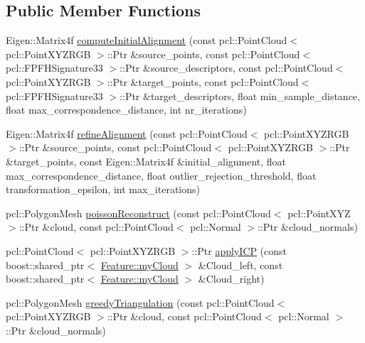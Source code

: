 \subsection*{Public Member Functions}
\begin{DoxyCompactItemize}
\item 
Eigen\+::\+Matrix4f \hyperlink{class_registration_af6438bb515d5f1f24111f8b97384b280}{compute\+Initial\+Alignment} (const pcl\+::\+Point\+Cloud$<$ pcl\+::\+Point\+X\+Y\+Z\+R\+GB $>$\+::Ptr \&source\+\_\+points, const pcl\+::\+Point\+Cloud$<$ pcl\+::\+F\+P\+F\+H\+Signature33 $>$\+::Ptr \&source\+\_\+descriptors, const pcl\+::\+Point\+Cloud$<$ pcl\+::\+Point\+X\+Y\+Z\+R\+GB $>$\+::Ptr \&target\+\_\+points, const pcl\+::\+Point\+Cloud$<$ pcl\+::\+F\+P\+F\+H\+Signature33 $>$\+::Ptr \&target\+\_\+descriptors, float min\+\_\+sample\+\_\+distance, float max\+\_\+correspondence\+\_\+distance, int nr\+\_\+iterations)
\item 
Eigen\+::\+Matrix4f \hyperlink{class_registration_add23c5ac003e016a3d7b66a7545615c5}{refine\+Alignment} (const pcl\+::\+Point\+Cloud$<$ pcl\+::\+Point\+X\+Y\+Z\+R\+GB $>$\+::Ptr \&source\+\_\+points, const pcl\+::\+Point\+Cloud$<$ pcl\+::\+Point\+X\+Y\+Z\+R\+GB $>$\+::Ptr \&target\+\_\+points, const Eigen\+::\+Matrix4f \&initial\+\_\+alignment, float max\+\_\+correspondence\+\_\+distance, float outlier\+\_\+rejection\+\_\+threshold, float transformation\+\_\+epsilon, int max\+\_\+iterations)
\item 
pcl\+::\+Polygon\+Mesh \hyperlink{class_registration_aa426fa2e667b8deebae10feaaca2c9ab}{poisson\+Reconstruct} (const pcl\+::\+Point\+Cloud$<$ pcl\+::\+Point\+X\+YZ $>$\+::Ptr \&cloud, const pcl\+::\+Point\+Cloud$<$ pcl\+::\+Normal $>$\+::Ptr \&cloud\+\_\+normals)
\item 
pcl\+::\+Point\+Cloud$<$ pcl\+::\+Point\+X\+Y\+Z\+R\+GB $>$\+::Ptr \hyperlink{class_registration_a3283eaf6aa94fbb2d7e697cd8ce6baef}{apply\+I\+CP} (const boost\+::shared\+\_\+ptr$<$ \hyperlink{struct_feature_1_1my_cloud}{Feature\+::my\+Cloud} $>$ \&Cloud\+\_\+left, const boost\+::shared\+\_\+ptr$<$ \hyperlink{struct_feature_1_1my_cloud}{Feature\+::my\+Cloud} $>$ \&Cloud\+\_\+right)
\item 
pcl\+::\+Polygon\+Mesh \hyperlink{class_registration_a14ea447775824a95cfe3396d304767fe}{greedy\+Triangulation} (const pcl\+::\+Point\+Cloud$<$ pcl\+::\+Point\+X\+Y\+Z\+R\+GB $>$\+::Ptr \&cloud, const pcl\+::\+Point\+Cloud$<$ pcl\+::\+Normal $>$\+::Ptr \&cloud\+\_\+normals)
\end{DoxyCompactItemize}


